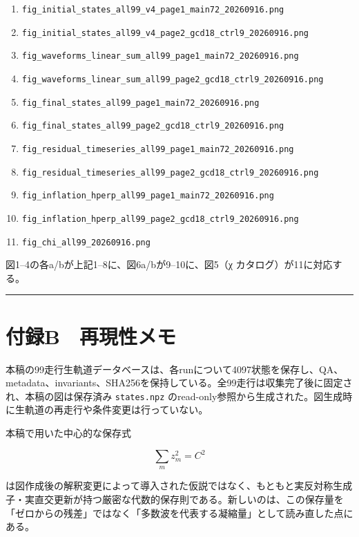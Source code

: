 \documentclass[
  a4paper,
]{ltjsarticle}
\providecommand{\tightlist}{%
  \setlength{\itemsep}{0pt}\setlength{\parskip}{0pt}}
\begin{document}
\begin{enumerate}
\def\labelenumi{\arabic{enumi}.}
\tightlist
\item
  \texttt{fig\_initial\_states\_all99\_v4\_page1\_main72\_20260916.png}
\item
  \texttt{fig\_initial\_states\_all99\_v4\_page2\_gcd18\_ctrl9\_20260916.png}
\item
  \texttt{fig\_waveforms\_linear\_sum\_all99\_page1\_main72\_20260916.png}
\item
  \texttt{fig\_waveforms\_linear\_sum\_all99\_page2\_gcd18\_ctrl9\_20260916.png}
\item
  \texttt{fig\_final\_states\_all99\_page1\_main72\_20260916.png}
\item
  \texttt{fig\_final\_states\_all99\_page2\_gcd18\_ctrl9\_20260916.png}
\item
  \texttt{fig\_residual\_timeseries\_all99\_page1\_main72\_20260916.png}
\item
  \texttt{fig\_residual\_timeseries\_all99\_page2\_gcd18\_ctrl9\_20260916.png}
\item
  \texttt{fig\_inflation\_hperp\_all99\_page1\_main72\_20260916.png}
\item
  \texttt{fig\_inflation\_hperp\_all99\_page2\_gcd18\_ctrl9\_20260916.png}
\item
  \texttt{fig\_chi\_all99\_20260916.png}
\end{enumerate}

図1--4の各a/bが上記1--8に、図6a/bが9--10に、図5（χ
カタログ）が11に対応する。

\begin{center}\rule{0.5\linewidth}{0.5pt}\end{center}

\section{付録B　再現性メモ}\label{ux4ed8ux9332b-ux518dux73feux6027ux30e1ux30e2}

本稿の99走行生軌道データベースは、各runについて4097状態を保存し、QA、metadata、invariants、SHA256を保持している。全99走行は収集完了後に固定され、本稿の図は保存済み
\texttt{states.npz}
のread-only参照から生成された。図生成時に生軌道の再走行や条件変更は行っていない。

本稿で用いた中心的な保存式

\[
\sum_mz_m^2=C^2
\]

は図作成後の解釈変更によって導入された仮説ではなく、もともと実反対称生成子・実直交更新が持つ厳密な代数的保存則である。新しいのは、この保存量を「ゼロからの残差」ではなく「多数波を代表する凝縮量」として読み直した点にある。
\end{document}
